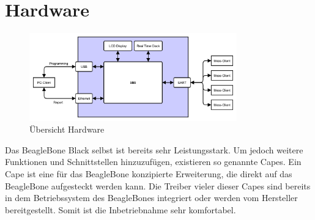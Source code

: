 
\section{Hardware}
\label{section_Hardware}

\begin{figure}[H]
\begin{center}
\includegraphics[width=0.8\textwidth ]{img/general/UebersichtMaster.pdf}
\caption{Übersicht Hardware}
\label{figure_AufbauBleagleBone}
\end{center}
\end{figure}

Das BeagleBone Black selbst ist bereits sehr Leistungsstark. Um jedoch weitere Funktionen und Schnittstellen hinzuzufügen, existieren so genannte Capes. Ein Cape ist eine für das BeagleBone konzipierte Erweiterung, die direkt auf das BeagleBone aufgesteckt werden kann. Die Treiber vieler dieser Capes sind bereits in dem Betriebssystem des BeagleBones integriert oder werden vom Hersteller bereitgestellt. Somit ist die Inbetriebnahme sehr komfortabel.


